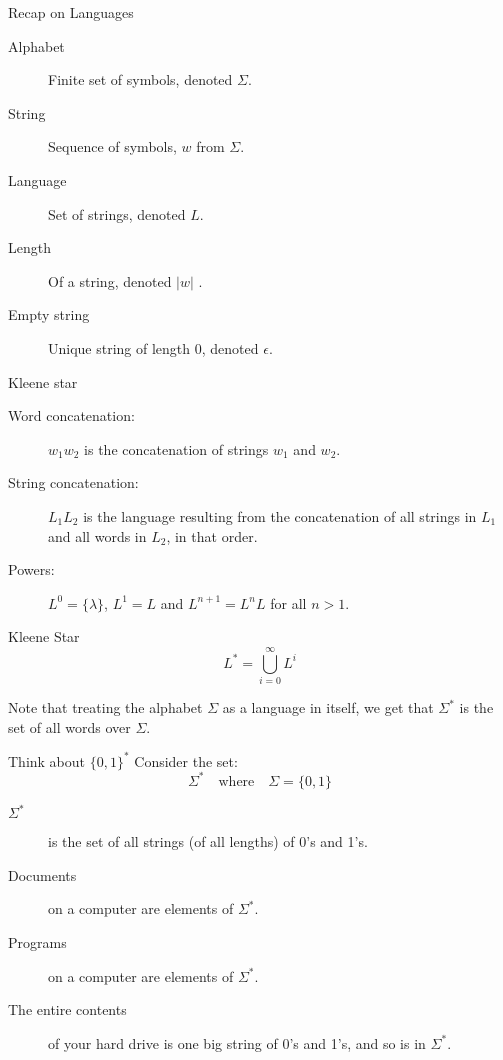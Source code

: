 \begin{frame}{Recap on Languages}
  \begin{description}
    \item[Alphabet] Finite set of symbols, denoted $\Sigma$.
    \item[String] Sequence of symbols, $w$ from $\Sigma$.
    \item[Language] Set of strings, denoted $L$.
    \item[Length] Of a string, denoted $|w|$  .
    \item[Empty string] Unique string of length 0, denoted $\epsilon$.
  \end{description}
\end{frame}


\begin{frame}{Kleene star}
  \begin{description}
    \item[Word concatenation:] $w_1 w_2$ is the concatenation of strings $w_1$ and $w_2$.
    \item[String concatenation:] $L_1 L_2$ is the language resulting from the concatenation of all strings in $L_1$ and all words in $L_2$, in that order.
    \item[Powers:] $L^0 = \{ \lambda \}$, $L^1 = L$ and $L^{n+1} = L^n L$ for all $n > 1$.
  \end{description}
  \vspace{0.5cm}
  \begin{block}{Kleene Star}
     \[ L^* =  \bigcup_{i=0}^{\infty} L^i \]
  \end{block}
  Note that treating the alphabet $\Sigma$ as a language in itself, we get that $\Sigma^*$ is the set of all words over $\Sigma$.
\end{frame}


\begin{frame}{Think about $\{0,1\}^*$}
  Consider the set:
  \[ \Sigma^* \quad \textrm{where} \quad \Sigma = \{0,1\} \]
  \vspace{1mm}
  \begin{description}
    \item[$\Sigma^*$]  is the set of all strings (of all lengths) of 0's and 1's.
    \item[Documents] on a computer are elements of $\Sigma^*$.
    \item[Programs] on a computer are elements of $\Sigma^*$.
    \item[The entire contents] of your hard drive is one big string of 0's and 1's, and so is in $\Sigma^*$.
  \end{description}
\end{frame}

